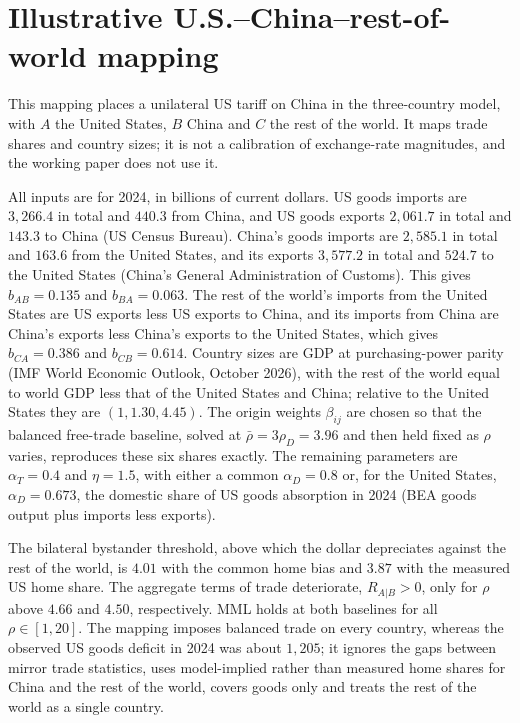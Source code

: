 \documentclass[11pt]{article}
\numberwithin{equation}{section}
\theoremstyle{plain}
\begin{document}
\section{Illustrative U.S.--China--rest-of-world mapping}
\label{sup:usmap}

This mapping places a unilateral US tariff on China in the three-country model, with $A$ the United States, $B$ China and $C$ the rest of the world. It maps trade shares and country sizes; it is not a calibration of exchange-rate magnitudes, and the working paper does not use it.

All inputs are for 2024, in billions of current dollars. US goods imports are $3{,}266.4$ in total and $440.3$ from China, and US goods exports $2{,}061.7$ in total and $143.3$ to China (US Census Bureau). China's goods imports are $2{,}585.1$ in total and $163.6$ from the United States, and its exports $3{,}577.2$ in total and $524.7$ to the United States (China's General Administration of Customs). This gives $b_{AB}=0.135$ and $b_{BA}=0.063$. The rest of the world's imports from the United States are US exports less US exports to China, and its imports from China are China's exports less China's exports to the United States, which gives $b_{CA}=0.386$ and $b_{CB}=0.614$. Country sizes are GDP at purchasing-power parity (IMF World Economic Outlook, October 2026), with the rest of the world equal to world GDP less that of the United States and China; relative to the United States they are $(1,1.30,4.45)$. The origin weights $\beta_{ij}$ are chosen so that the balanced free-trade baseline, solved at $\bar\rho=3\rho_D=3.96$ and then held fixed as $\rho$ varies, reproduces these six shares exactly. The remaining parameters are $\alpha_T=0.4$ and $\eta=1.5$, with either a common $\alpha_D=0.8$ or, for the United States, $\alpha_D=0.673$, the domestic share of US goods absorption in 2024 (BEA goods output plus imports less exports).

The bilateral bystander threshold, above which the dollar depreciates against the rest of the world, is $4.01$ with the common home bias and $3.87$ with the measured US home share. The aggregate terms of trade deteriorate, $R_{A|B}>0$, only for $\rho$ above $4.66$ and $4.50$, respectively. MML holds at both baselines for all $\rho\in[1,20]$. The mapping imposes balanced trade on every country, whereas the observed US goods deficit in 2024 was about $1{,}205$; it ignores the gaps between mirror trade statistics, uses model-implied rather than measured home shares for China and the rest of the world, covers goods only and treats the rest of the world as a single country.
\end{document}
